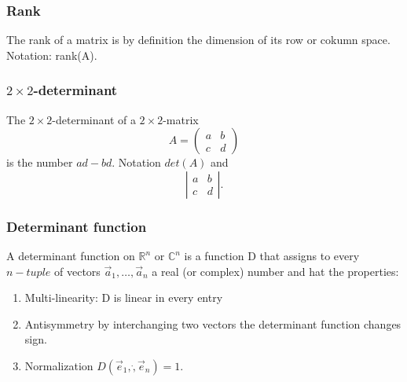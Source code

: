 \documentclass{article}
\begin{document}
			\subsubsection{Rank}
			The rank of a matrix is by definition the dimension of its row or cokumn space. Notation: rank(A).
			
			\subsubsection{$2 \times 2$-determinant}
			The $2\times 2$-determinant of a $2\times2$-matrix
			\begin{equation*}
				A = \begin{pmatrix}
					a & b \\
					c & d
				\end{pmatrix}
			\end{equation*}
			is the number $ad-bd$. Notation $det(A)$ and
			\[
				\left |
					\begin{matrix}
						a & b \\
						c & d
					\end{matrix}
				\right |.
			\]
			
			\subsubsection{Determinant function}
			A determinant function on $\mathbb{R}^n$ or $\mathbb{C}^n$ is a function D that assigns to every $n-tuple$ of vectors $\vec{a}_1,\dots,\vec{a}_n$ a real (or complex) number and hat the properties:
			\begin{enumerate}
				\item Multi-linearity: D is linear in every entry
				\item Antisymmetry by interchanging two vectors the determinant function changes sign.
				\item Normalization $D(\vec{e}_1,\dot,\vec{e}_n) = 1$.
			\end{enumerate}
		
\end{document}
